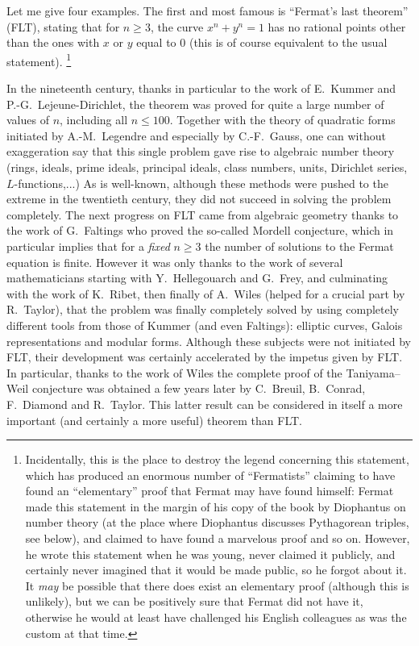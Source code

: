 \documentclass[12pt,a4paper]{article}
\begin{document}
Let me give four examples. The first and most famous is ``Fermat's last 
theorem'' (FLT), stating that for $n\ge3$, the curve 
$x^n+y^n=1$ has no rational points other than the ones with $x$ or $y$ equal 
to $0$ (this is of course equivalent to the usual statement).
\footnote{Incidentally, this is the place to destroy the legend concerning 
this statement, which has produced an enormous number of ``Fermatists'' 
claiming to have found an ``elementary'' proof that Fermat may have found 
himself: Fermat made this statement in
the margin of his copy of the book by Diophantus on number theory (at the
place where Diophantus discusses Pythagorean triples, see below), and claimed
to have found a marvelous proof and so on. However, he wrote this statement
when he was young, never claimed it publicly, and certainly never imagined
that it would be made public, so he forgot about it. It \emph{may} be
possible that there does exist an elementary proof (although this is
unlikely), but we can be positively sure that Fermat did not have it, otherwise
he would at least have challenged his English colleagues as was the custom
at that time.}

In the nineteenth century, thanks in particular to the work of E.~Kummer
and P.-G.~Lejeune-Dirichlet,
the theorem was proved for quite a large number of values
of $n$, including all $n\le100$. Together with the theory of quadratic
forms initiated by A.-M.~Legendre and especially by C.-F.~Gauss, 
one can 
without exaggeration say that this single problem gave rise to algebraic number
theory (rings, ideals, prime ideals, principal ideals, class numbers, units,
Dirichlet series, $L$-functions,...) As is well-known, although these
methods were pushed to the extreme in the twentieth century, they did not
succeed in solving the problem completely. The next progress on FLT came from
algebraic geometry thanks to the work of G.~Faltings who proved the so-called
Mordell conjecture, which in particular implies that for a \emph{fixed} $n\ge3$
the number of solutions to the Fermat equation is finite. However it was only 
thanks to the work of several mathematicians starting with 
Y.~Hellegouarch and G.~Frey, and culminating with the work of K.~Ribet, 
then finally of A.~Wiles (helped for a crucial part by R.~Taylor),
that the problem
was finally completely solved by using completely different tools from those
of Kummer (and even Faltings): elliptic curves, 
Galois representations and modular forms.
Although these subjects were not initiated by FLT, their development was 
certainly accelerated by the impetus given by FLT. In particular, thanks to
the work of Wiles the complete proof of the Taniyama--Weil conjecture was
obtained a few years later by C.~Breuil, 
B.~Conrad, F.~Diamond and R.~Taylor. This latter result can be considered in 
itself a more important (and certainly a more useful) theorem than FLT.
\end{document}
